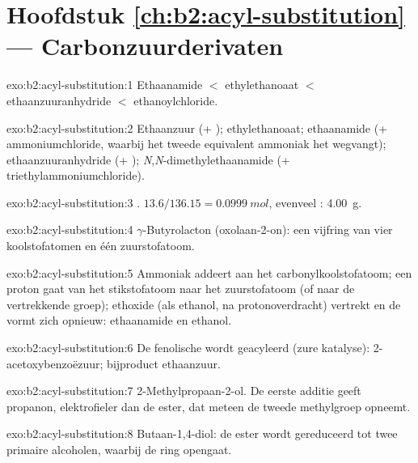 \section*{Hoofdstuk \ref{ch:b2:acyl-substitution} --- Carbonzuurderivaten}

\begin{solution}{exo:b2:acyl-substitution:1}
Ethaanamide $<$ ethylethanoaat $<$ ethaanzuuranhydride $<$ ethanoylchloride.
\end{solution}

\begin{solution}{exo:b2:acyl-substitution:2}
Ethaanzuur (+ ); ethylethanoaat; ethaanamide (+ ammoniumchloride, waarbij het tweede equivalent
ammoniak het  wegvangt); ethaanzuuranhydride (+ );
\textit{N},\textit{N}-dimethylethaanamide (+ triethylammoniumchloride).
\end{solution}

\begin{solution}{exo:b2:acyl-substitution:3}
. $13.6/136.15 = \qty{0.0999}{mol}$, evenveel
: \qty{4.00}{g}.
\end{solution}

\begin{solution}{exo:b2:acyl-substitution:4}
$\gamma$-Butyrolacton (oxolaan-2-on): een vijfring van vier koolstofatomen en één zuurstofatoom.
\end{solution}

\begin{solution}{exo:b2:acyl-substitution:5}
Ammoniak addeert aan het carbonylkoolstofatoom; een proton gaat van het stikstofatoom naar het zuurstofatoom (of naar de
vertrekkende groep); ethoxide (als ethanol, na protonoverdracht) vertrekt en de  vormt zich opnieuw:
ethaanamide en ethanol.
\end{solution}

\begin{solution}{exo:b2:acyl-substitution:6}
De fenolische  wordt geacyleerd (zure katalyse): 2-acetoxybenzoëzuur; bijproduct ethaanzuur.
\end{solution}

\begin{solution}{exo:b2:acyl-substitution:7}
2-Methylpropaan-2-ol. De eerste additie geeft propanon, elektrofieler dan de ester, dat
meteen de tweede methylgroep opneemt.
\end{solution}

\begin{solution}{exo:b2:acyl-substitution:8}
Butaan-1,4-diol: de ester wordt gereduceerd tot twee primaire alcoholen, waarbij de ring opengaat.
\end{solution}

